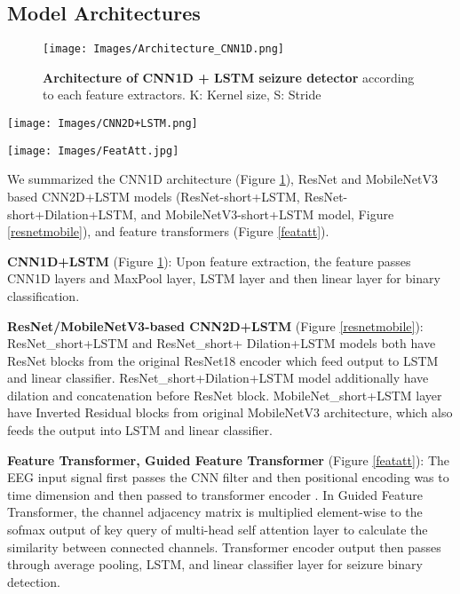 \documentclass[pmlr,twocolumn,10pt]{jmlr}
\begin{document}
\subsection{Model Architectures}
\label{sec: app_arch}
\begin{figure}[h!]
	\centering
	\texttt{[image: Images/Architecture\_CNN1D.png]}
    \caption{\small \textbf{Architecture of CNN1D + LSTM seizure detector} according to each feature extractors. K: Kernel size, S: Stride}
	\label{1D_architecture}
\end{figure} \begin{figure*}[h!]
	\centering
	\texttt{[image: Images/CNN2D+LSTM.png]}
    \caption{\small \textbf{Architecture of ResNet-short+LSTM, ResNet-short+Dilation+LSTM, and MobileNetV3-short+LSTM Models} K: Kernel size, S: Stride}
	\label{resnetmobile}
\end{figure*} \begin{figure*}[h!]
	\centering
	\texttt{[image: Images/FeatAtt.jpg]}
    \caption{\small \textbf{Architecture of Feature Transformer and Guided Transformer}. Feature Transformer and Guided Transformer shares same architecture, but the channel adjacency matrix is multiplied to the key and query output of multi-head self attention module in Guided Transformer transformer encoder.}
	\label{featatt}
\end{figure*} We summarized the CNN1D architecture (Figure \ref{1D_architecture}), ResNet and MobileNetV3 based CNN2D+LSTM models (ResNet-short+LSTM, ResNet-short+Dilation+LSTM, and MobileNetV3-short+LSTM model, Figure \ref{resnetmobile}), and feature transformers (Figure \ref{featatt}). 

\noindent\textbf{CNN1D+LSTM} (Figure \ref{1D_architecture}): Upon feature extraction, the feature passes CNN1D layers and MaxPool layer, LSTM layer and then linear layer for binary classification. 

\noindent\textbf{ResNet/MobileNetV3-based CNN2D+LSTM} (Figure \ref{resnetmobile}): ResNet\_short+LSTM and ResNet\_short+ Dilation+LSTM models both have ResNet blocks from the original ResNet18 encoder which feed output to LSTM and linear classifier. ResNet\_short+Dilation+LSTM model additionally have dilation and concatenation before ResNet block. MobileNet\_short+LSTM layer have Inverted Residual blocks from original MobileNetV3 architecture, which also feeds the output into LSTM and linear classifier.

\noindent\textbf{Feature Transformer, Guided Feature Transformer} (Figure \ref{featatt}): The EEG input signal first passes the CNN filter and then positional encoding was to time dimension and then passed to transformer encoder \citep{vaswani2017attention}. In Guided Feature Transformer, the channel adjacency matrix is multiplied element-wise to the sofmax output of key query of multi-head self attention layer to calculate the similarity between connected channels. Transformer encoder output then passes through average pooling, LSTM, and linear classifier layer for seizure binary detection.
\end{document}

